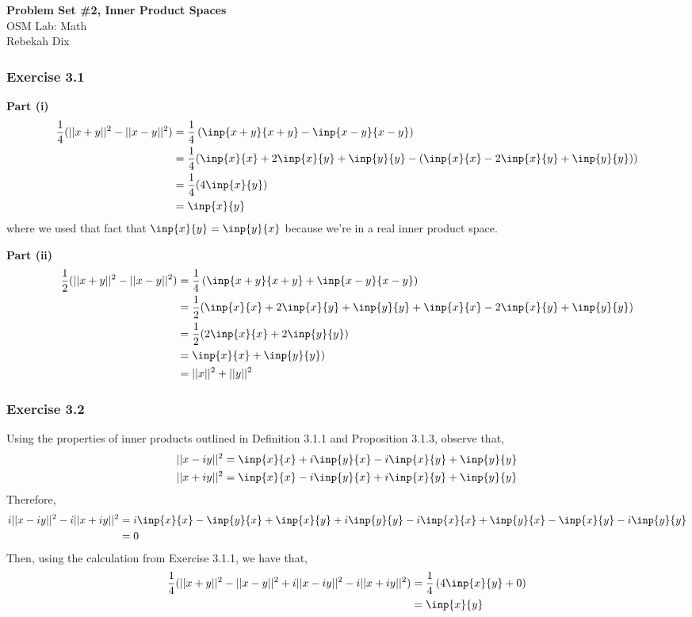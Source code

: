 \documentclass[letterpaper,12pt]{article}
\theoremstyle{definition}
\begin{document}
\begin{flushleft}
  \textbf{\large{Problem Set \#2, Inner Product Spaces}} \\
  OSM Lab: Math \\
  Rebekah Dix
\end{flushleft}

\vspace{5mm}

\subsubsection*{Exercise 3.1}
\textbf{Part (i)}
\begin{align*}
	\frac{1}{4}(||x + y||^2 - ||x - y||^2) &= \frac{1}{4} \left( \inp{x+y}{x+y}  - \inp{x-y}{x-y} \right) \\
	&= \frac{1}{4}( \inp{x}{x} + 2\inp{x}{y} + \inp{y}{y} - (\inp{x}{x} - 2\inp{x}{y} + \inp{y}{y})) \\
	&= \frac{1}{4}(4\inp{x}{y}) \\
	&= \inp{x}{y}
\end{align*}
where we used that fact that $\inp{x}{y} = \inp{y}{x}$ because we're in a real inner product space. 
\vspace{5mm}

\noindent \textbf{Part (ii)}
\begin{align*}
	\frac{1}{2}(||x + y||^2 - ||x - y||^2) &= \frac{1}{4} \left( \inp{x+y}{x+y}  + \inp{x-y}{x-y} \right) \\
	&= \frac{1}{2}( \inp{x}{x} + 2\inp{x}{y} + \inp{y}{y} + \inp{x}{x} - 2\inp{x}{y} + \inp{y}{y}) \\
	&= \frac{1}{2}( 2 \inp{x}{x} + 2 \inp{y}{y}) \\
	&= \inp{x}{x} + \inp{y}{y}) \\
	&= ||x||^2 + ||y||^2
\end{align*}

\subsubsection*{Exercise 3.2}
Using the properties of inner products outlined in Definition 3.1.1 and Proposition 3.1.3, observe that,
\begin{align*}
	||x - iy||^2 &= \inp{x}{x} + i\inp{y}{x} - i\inp{x}{y} + \inp{y}{y} \\
	||x + iy||^2 &= \inp{x}{x} -i\inp{y}{x} + i\inp{x}{y} + \inp{y}{y}
\end{align*}
Therefore,
\begin{align*}
	i||x - iy||^2 - i||x + iy||^2 &= i \inp{x}{x} -\inp{y}{x}  + \inp{x}{y} + i \inp{y}{y} -i  \inp{x}{x} + \inp{y}{x} -  \inp{x}{y} -  i \inp{y}{y} \\
	&= 0
\end{align*}
Then, using the calculation from Exercise 3.1.1, we have that,
\begin{align*}
	\frac{1}{4}(||x + y||^2 - ||x - y||^2 +i||x - iy||^2 - i||x + iy||^2) &= \frac{1}{4} \left(4 \inp{x}{y} + 0 \right) \\
	&= \inp{x}{y}
\end{align*}
\end{document}
